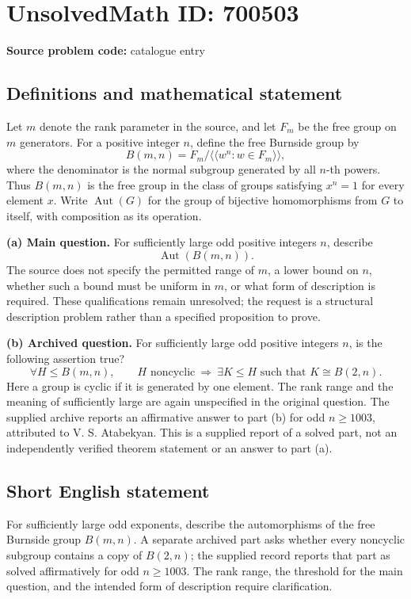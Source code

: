 \documentclass[11pt]{article}
\begin{document}
\section*{UnsolvedMath ID: 700503}
\textbf{Source problem code:} catalogue entry
\subsection{Definitions and mathematical statement}
Let \(m\) denote the rank parameter in the source, and let \(F_m\) be the free group on \(m\) generators. For a positive integer \(n\), define the free Burnside group by
\[
B(m,n)=F_m/\langle\!\langle w^n : w\in F_m\rangle\!\rangle,
\]
where the denominator is the normal subgroup generated by all \(n\)-th powers. Thus \(B(m,n)\) is the free group in the class of groups satisfying \(x^n=1\) for every element \(x\). Write \(\operatorname{Aut}(G)\) for the group of bijective homomorphisms from \(G\) to itself, with composition as its operation.

\textbf{(a) Main question.} For sufficiently large odd positive integers \(n\), describe
\[
\operatorname{Aut}(B(m,n)).
\]
The source does not specify the permitted range of \(m\), a lower bound on \(n\), whether such a bound must be uniform in \(m\), or what form of description is required. These qualifications remain unresolved; the request is a structural description problem rather than a specified proposition to prove.

\textbf{(b) Archived question.} For sufficiently large odd positive integers \(n\), is the following assertion true?
\[
\forall H\leq B(m,n),\qquad
H\text{ noncyclic}\ \Longrightarrow\
\exists K\leq H\text{ such that }K\cong B(2,n).
\]
Here a group is cyclic if it is generated by one element. The rank range and the meaning of sufficiently large are again unspecified in the original question. The supplied archive reports an affirmative answer to part (b) for odd \(n\geq 1003\), attributed to V. S. Atabekyan. This is a supplied report of a solved part, not an independently verified theorem statement or an answer to part (a).
\subsection{Short English statement}
For sufficiently large odd exponents, describe the automorphisms of the free Burnside group \(B(m,n)\). A separate archived part asks whether every noncyclic subgroup contains a copy of \(B(2,n)\); the supplied record reports that part as solved affirmatively for odd \(n\geq 1003\). The rank range, the threshold for the main question, and the intended form of description require clarification.
\end{document}
